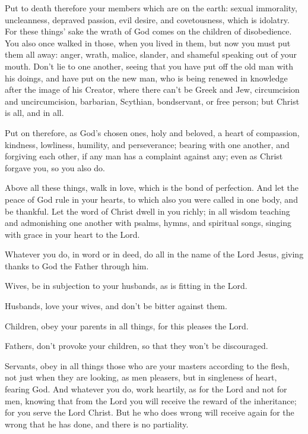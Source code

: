  Put to death therefore your members which are on the earth:
sexual immorality, uncleanness, depraved passion, evil desire, and
covetousness, which is idolatry.  For these things' sake the
wrath of God comes on the children of disobedience.  You
also once walked in those, when you lived in them,  but now
you must put them all away: anger, wrath, malice, slander, and shameful
speaking out of your mouth.  Don't lie to one another,
seeing that you have put off the old man with his doings, 
and have put on the new man, who is being renewed in knowledge after the
image of his Creator,  where there can't be Greek and Jew,
circumcision and uncircumcision, barbarian, Scythian, bondservant, or
free person; but Christ is all, and in all.

 Put on therefore, as God's chosen ones, holy and beloved,
a heart of compassion, kindness, lowliness, humility, and perseverance;
 bearing with one another, and forgiving each other, if any
man has a complaint against any; even as Christ forgave you, so you also
do.

 Above all these things, walk in love, which is the bond of
perfection.  And let the peace of God rule in your hearts,
to which also you were called in one body, and be thankful.
 Let the word of Christ dwell in you richly; in all wisdom
teaching and admonishing one another with psalms, hymns, and spiritual
songs, singing with grace in your heart to the Lord.

 Whatever you do, in word or in deed, do all in the name of
the Lord Jesus, giving thanks to God the Father through him.

 Wives, be in subjection to your husbands, as is fitting in
the Lord.

 Husbands, love your wives, and don't be bitter against
them.

 Children, obey your parents in all things, for this
pleases the Lord.

 Fathers, don't provoke your children, so that they won't
be discouraged.

 Servants, obey in all things those who are your masters
according to the flesh, not just when they are looking, as men pleasers,
but in singleness of heart, fearing God.  And whatever you
do, work heartily, as for the Lord and not for men, 
knowing that from the Lord you will receive the reward of the
inheritance; for you serve the Lord Christ.  But he who
does wrong will receive again for the wrong that he has done, and there
is no partiality.

